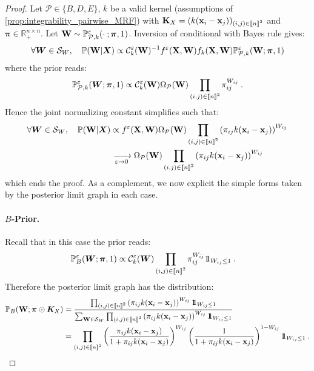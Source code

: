 \begin{proof}
Let $\mathcal{P} \in \{B, D, E\}$, $k$ be a valid kernel (assumptions of \cref{prop:integrability_pairwise_MRF}) with $\mathbf{K}_{X} = (k(\mathbf{x}_{i} - \mathbf{x}_{j}))_{(i,j) \in {[\![n]\!]}^2}$ and $\bm{\pi} \in \mathbb{R}_+^{n \times n}$. Let $\mathbf{W} \sim \mathbb{P}_{\mathcal{P},k}^{\varepsilon}(\cdot \: ; \bm{\pi},1)$. Inversion of conditional with Bayes rule gives:
\begin{align}
    \forall \bm{W} \in \mathcal{S}_{W}, \quad \mathbb{P}(\mathbf{W} | \bm{X}) \propto
    \mathcal{C}_{k}^{\varepsilon}(\mathbf{W})^{-1} f^{\varepsilon}(\mathbf{X}, \mathbf{W}) f_{k}(\mathbf{X}, \mathbf{W}) \mathbb{P}^{\varepsilon}_{\mathcal{P},k}(\mathbf{W}; \bm{\pi}, 1) \label{inversion_Conditional}
\end{align}
where the prior reads:
\begin{align}
    \mathbb{P}_{\mathcal{P},k}^{\varepsilon}(\bm{W}; \bm{\pi}, 1) \propto \mathcal{C}^{\varepsilon}_k(\mathbf{W}) \Omega_{\mathcal{P}}(\mathbf{W}) \prod_{(i,j) \in {[\![n]\!]}^2} \pi_{ij}^{W_{ij}} \:.
\end{align}
Hence the joint normalizing constant simplifies such that:
\begin{align}
    \forall \bm{W} \in \mathcal{S}_{W}, \quad \mathbb{P}(\mathbf{W} | \bm{X}) &\propto
    f^{\varepsilon}(\mathbf{X}, \mathbf{W}) \Omega_{\mathcal{P}}(\mathbf{W}) \prod_{(i,j) \in {[\![n]\!]}^2} \left(\pi_{ij} k(\mathbf{x}_i - \mathbf{x}_j)\right)^{W_{ij}} \\
    &\xrightarrow[\varepsilon \to 0]{} \Omega_{\mathcal{P}}(\mathbf{W}) \prod_{(i,j) \in {[\![n]\!]}^2}  \left(\pi_{ij} k(\mathbf{x}_i - \mathbf{x}_j)\right)^{W_{ij}}
\end{align}
which ends the proof. As a complement, we now explicit the simple forms taken by the posterior limit graph in each case.

\paragraph{$B$-Prior.}
Recall that in this case the prior reads:
\begin{align*}
    \mathbb{P}_{B}^{\varepsilon}(\bm{W}; \bm{\pi},1) &\propto \mathcal{C}_{k}^{\varepsilon}(\bm{W}) \prod_{(i,j) \in {[\![n]\!]}^2} \pi_{ij}^{W_{ij}} 1\!\!1_{W_{ij} \leq 1} \:.
\end{align*}
Therefore the posterior limit graph has the distribution:
\begin{align*}
    \mathbb{P}_{B}(\W ;\bm{\pi} \odot \bm{K}_{X})
    &= \frac{\prod_{(i,j) \in \integ{n}^2}  \left(\pi_{ij} k(\mathbf{x}_i - \mathbf{x}_j)\right)^{W_{ij}} \ind_{W_{ij} \leq 1}}{\sum_{\W \in \mathcal{S}_{W}} \prod_{(i,j) \in \integ{n}^2}  \left(\pi_{ij} k(\mathbf{x}_i - \mathbf{x}_j)\right)^{W_{ij}} \ind_{W_{ij} \leq 1}} \\
    &= \prod_{(i,j) \in \integ{n}^2}  \left(\frac{\pi_{ij} k(\mathbf{x}_i - \mathbf{x}_j)}{1+\pi_{ij} k(\mathbf{x}_i - \mathbf{x}_j)}\right)^{W_{ij}} \left(\frac{1}{1+\pi_{ij} k(\mathbf{x}_i - \mathbf{x}_j)}\right)^{1-W_{ij}} \ind_{W_{ij} \leq 1} \:.
\end{align*}


\end{proof}
